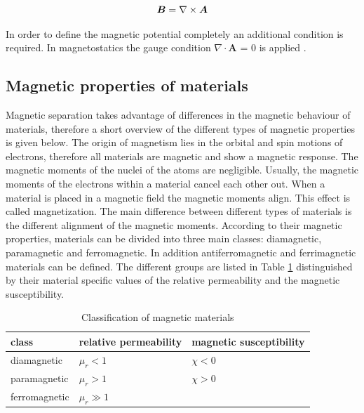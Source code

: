 \begin{equation}
\label{eq:Pot_A}
\centering
\boldsymbol{B} = \nabla\times\boldsymbol{A}
\end{equation}

In order to define the magnetic potential completely an additional condition is required. In magnetostatics the gauge condition $\nabla\cdotp\boldsymbol{A}$ = 0 is applied \cite{schwab2013begriffswelt}.   

\subsection{Magnetic properties of materials}
\label{subsec:Mag_mat}



Magnetic separation takes advantage of differences in the magnetic behaviour of materials, therefore a short overview of the different types of magnetic properties is given below. The origin of magnetism lies in the orbital and spin motions of electrons, therefore all materials are magnetic and show a magnetic response. The magnetic moments of the nuclei of the atoms are negligible. Usually,  the magnetic moments of the electrons within a material cancel each other out. When a material is placed in a magnetic field the magnetic moments align. This effect is called magnetization. The main difference between different types of materials is the different alignment of the magnetic moments. According to their magnetic properties, materials can be divided into three main classes: diamagnetic, paramagnetic and ferromagnetic. In addition antiferromagnetic and ferrimagnetic materials can be defined. The different groups are listed in Table \ref{table:mag_material} distinguished by their material specific values of the relative permeability and the magnetic susceptibility. 

\begin{table}[H]
\centering
\caption{Classification of magnetic materials}
\label{table:mag_material}
\begin{tabular}{lll}\hline
class & relative permeability & magnetic susceptibility \\
\hline\hline
diamagnetic & $\mu_{r}<1$ & $\chi<0$ \\
paramagnetic & $\mu_{r}>1$ & $\chi>0$ \\
ferromagnetic & $\mu_{r}\gg1$ &  \\
\hline
\end{tabular}
\end{table}

